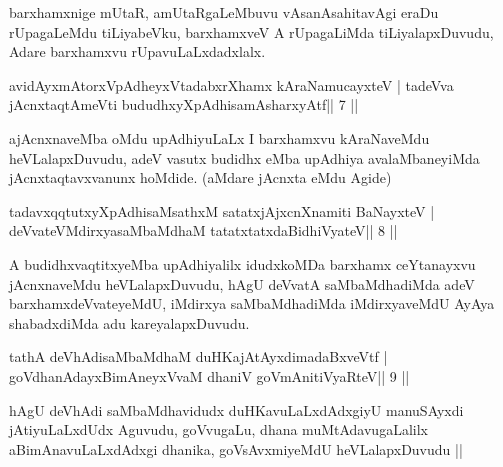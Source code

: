 \begin{artha}
barxhamxnige mUtaR, amUtaRgaLeMbuvu vAsanAsahitavAgi eraDu rUpagaLeMdu tiLiyabeVku, barxhamxveV A rUpagaLiMda tiLiyalapxDuvudu, Adare barxhamxvu rUpavuLaLxdadxlalx.
\end{artha}



\begin{shl}
avidAyxmAtorxVpAdheyxVtadabxrXhamx kAraNamucayxteV |
tadeVva jAcnxtaqtAmeVti bududhxyXpAdhisamAsharxyAtf\hfill || 7 ||
\end{shl}

\begin{artha}
ajAcnxnaveMba oMdu upAdhiyuLaLx I barxhamxvu kAraNaveMdu
heVLalapxDuvudu, adeV vasutx budidhx eMba upAdhiya avalaMbaneyiMda
jAcnxtaqtavxvanunx hoMdide. (aMdare jAcnxta eMdu Agide)
\end{artha}



\begin{shl}
tadavxqqtutxyXpAdhisaMsathxM satatxjAjxcnXnamiti BaNayxteV |
deVvateVMdirxyasaMbaMdhaM tatatxtatxdaBidhiVyateV\hfill || 8 ||
\end{shl}

\begin{artha}
A budidhxvaqtitxyeMba upAdhiyalilx idudxkoMDa barxhamx ceYtanayxvu jAcnxnaveMdu heVLalapxDuvudu, hAgU deVvatA saMbaMdhadiMda adeV barxhamxdeVvateyeMdU, iMdirxya saMbaMdhadiMda iMdirxyaveMdU AyAya shabadxdiMda adu kareyalapxDuvudu.
\end{artha}



\begin{shl}
tathA deVhAdisaMbaMdhaM duHKajAtAyxdimadaBxveVtf |
goVdhanAdayxBimAneyxVvaM dhaniV goVmAnitiVyaRteV\hfill || 9 ||
\end{shl}

\begin{artha}
hAgU deVhAdi saMbaMdhavidudx duHKavuLaLxdAdxgiyU
manuSAyxdi jAtiyuLaLxdUdx Aguvudu, goVvugaLu, dhana muMtAdavugaLalilx
aBimAnavuLaLxdAdxgi dhanika, goVsAvxmiyeMdU heVLalapxDuvudu || 
\end{artha}



